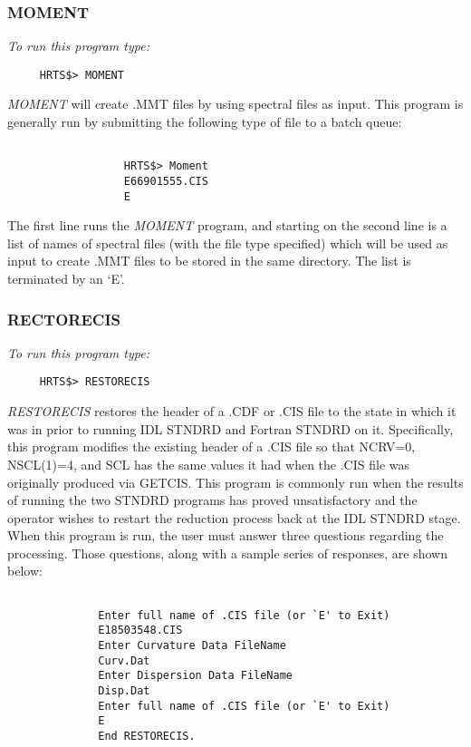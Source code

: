 \subsubsection{MOMENT}

{\em To run this program type:}
\begin{verbatim}
     HRTS$> MOMENT
\end{verbatim}
      {\em MOMENT} will create .MMT files by using spectral files as input.
   This program is generally run by submitting the following type of
   file to a batch queue:
\begin{center}
\begin{verbatim}

                  HRTS$> Moment
                  E66901555.CIS
                  E

\end{verbatim}
\end{center}
      The first line runs the {\em MOMENT} program, and starting on the second
   line is a list of names of spectral files (with the file type
   specified) which will be used as input to create .MMT files to be
   stored in the same directory.  The list is terminated by an `E'.

\subsubsection{RECTORECIS}

{\em To run this program type:}
\begin{verbatim}
     HRTS$> RESTORECIS
\end{verbatim}
{\em RESTORECIS} restores the header of a .CDF or .CIS file to the state
   in which it was in prior to running IDL STNDRD and Fortran STNDRD on
   it.  Specifically, this program modifies the existing header
   of a .CIS file so that NCRV=0, NSCL(1)=4, and SCL has the same values
   it had when the .CIS file was originally produced via GETCIS.  This
   program is commonly run when the results of running the two STNDRD
   programs has proved unsatisfactory and the operator wishes to restart
   the reduction process back at the IDL STNDRD stage.  When this program
   is run, the user must answer three questions regarding the processing.
   Those questions, along with a sample series of responses, are shown
   below:
\begin{verbatim}

              Enter full name of .CIS file (or `E' to Exit)
              E18503548.CIS
              Enter Curvature Data FileName
              Curv.Dat
              Enter Dispersion Data FileName
              Disp.Dat
              Enter full name of .CIS file (or `E' to Exit)
              E
              End RESTORECIS.

\end{verbatim}

